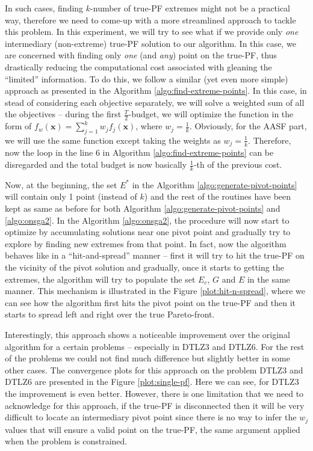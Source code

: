 \documentclass[journal]{IEEEtran}
\begin{document}
In such cases, finding \(k\)-number of true-PF extremes might not be a practical way, therefore we need to come-up with a more streamlined approach to tackle this problem. In this experiment, we will try to see what if we provide only \textit{one} intermediary (non-extreme) true-PF solution to our algorithm. In this case, we are concerned with finding only \textit{one} (and \textit{any}) point on the true-PF, thus drastically reducing the computational cost associated with gleaning the ``limited'' information. To do this, we follow a similar (yet even more simple) approach as presented in the Algorithm \ref{algo:find-extreme-points}. In this case, in stead of considering each objective separately, we will solve a weighted sum of all the objectives -- during the first \(\frac{T}{2}\)-budget, we will optimize the function in the form of \(f_w(\mathbf{x}) = \sum_{j=1}^k w_j f_j(\mathbf{x})\), where \(w_j = \frac{1}{k}\). Obviously, for the AASF part, we will use the same function except taking the weights as \(w_j = \frac{1}{k}\). Therefore, now the loop in the line 6 in Algorithm \ref{algo:find-extreme-points} can be disregarded and the total budget is now basically \(\frac{1}{k}\)-th of the previous cost.

Now, at the beginning, the set \(E^\ast\) in the Algorithm \ref{algo:generate-pivot-points} will contain only 1 point (instead of \(k\)) and the rest of the routines have been kept as same as before for both Algorithm \ref{algo:generate-pivot-points} and \ref{algo:onsga2}. In the Algorithm \ref{algo:onsga2}, the procedure will now start to optimize by accumulating solutions near one pivot point and gradually try to explore by finding new extremes from that point. In fact, now the algorithm behaves like in a ``hit-and-spread'' manner -- first it will try to hit the true-PF on the vicinity of the pivot solution and gradually, once it starts to getting the extremes, the algorithm will try to populate the set \(E_c\), \(G\) and \(E\) in the same manner. This mechanism is illustrated in the Figure \ref{plot:hit-n-spread}, where we can see how the algorithm first hits the pivot point on the true-PF and then it starts to spread left and right over the true Pareto-front.

Interestingly, this approach shows a noticeable improvement over the original algorithm for a certain problems -- especially in DTLZ3 and DTLZ6. For the rest of the problems we could not find much difference but slightly better in some other cases. The convergence plots for this approach on the problem DTLZ3 and DTLZ6 are presented in the Figure \ref{plot:single-pf}. Here we can see, for DTLZ3 the improvement is even better. However, there is one limitation that we need to acknowledge for this approach, if the true-PF is disconnected then it will be very difficult to locate an intermediary pivot point since there is no way to infer the \(w_j\) values that will ensure a valid point on the true-PF, the same argument applied when the problem is constrained.
\end{document}
